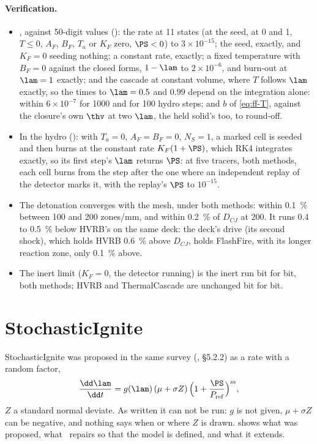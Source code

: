 \paragraph{Verification.}
\begin{itemize}
\item {}, against 50-digit values ():
  the rate at 11 states (at the seed, at 0 and 1, $T \le 0$, $A_F$, $B_F$,
  $T_a$ or $K_F$ zero, $\PS < 0$) to $3\times10^{-15}$; the seed, exactly, and
  $K_F = 0$ seeding nothing; a constant rate, exactly; a fixed temperature
  with $B_F = 0$ against the closed forms, $1 - \lam$ to $2\times10^{-6}$,
  and burn-out at $\lam = 1$ exactly; and the cascade at constant volume,
  where $T$ follows $\lam$ exactly, so the times to $\lam = 0.5$ and $0.99$
  depend on the integration alone: within $6\times10^{-7}$ for 1000 and for
  100 hydro steps; and $b$ of \cref{eq:ff-T}, against the closure's own
  $\thv$ at two $\lam$, the held solid's too, to round-off.
\item In the hydro (): with $T_a =
  0$, $A_F = B_F = 0$, $N_S = 1$, a marked cell is seeded and then burns at
  the constant rate $K_F(1 + \PS)$, which RK4 integrates exactly, so its
  first step's $\lam$ returns $\PS$: at five tracers, both methods, each cell
  burns from the step after the one where an independent replay of the
  detector marks it, with the replay's $\PS$ to $10^{-15}$.
\item The detonation converges with the mesh, under both methods: within
  0.1~\% between 100 and 200 zones/mm, and within 0.2~\% of $D_{CJ}$ at 200.
  It runs 0.4 to 0.5~\% below HVRB's on the same deck: the deck's drive (its
  second shock), which holds HVRB 0.6~\% above $D_{CJ}$, holds FlashFire,
  with its longer reaction zone, only 0.1~\% above.
\item The inert limit ($K_F = 0$, the detector running) is the inert run bit
  for bit, both methods; HVRB and ThermalCascade are unchanged bit for bit.
\end{itemize}

\section{StochasticIgnite}
\label{sec:stochasticignite}

StochasticIgnite was proposed in the same survey (\cite{kittell2025sand},
\S 5.2.2) as a rate with a random factor,
\begin{equation*}
  \frac{\dd\lam}{\dd t} = g(\lam)\,(\mu + \sigma Z)\,
  \Bigl(1 + \frac{\PS}{P_{\mathrm{ref}}}\Bigr)^{m},
\end{equation*}
$Z$ a standard normal deviate. As written it can not be run: $g$ is not
given, $\mu + \sigma Z$ can be negative, and nothing says when or where $Z$
is drawn.  shows what was proposed, what \bw\ repairs so
that the model is defined, and what it extends.

